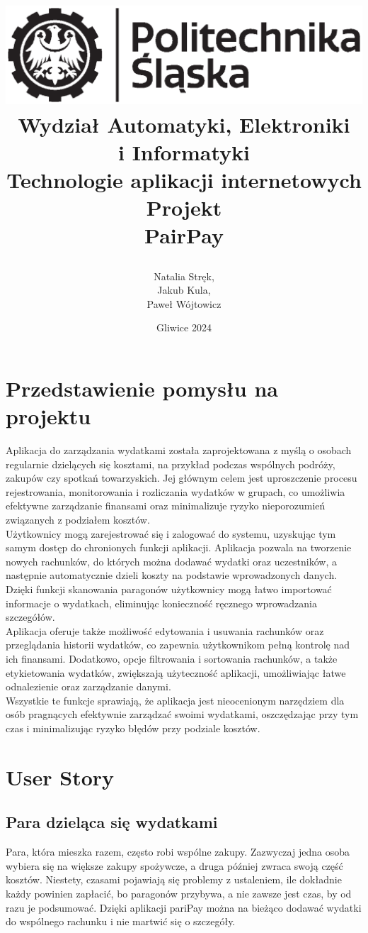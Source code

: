 \documentclass[12pt,titlepage]{article}
\title{
\includegraphics[scale=0.75]{img/politechnika_sl_logo_bw_poziom_pl.eps}\\
\textbf{Wydział Automatyki, Elektroniki\\
i Informatyki}\\
\vspace*{1cm}
Technologie aplikacji internetowych \\ Projekt \\ PairPay

\vspace*{5cm}
}
\author{
Natalia Stręk,\\
Jakub Kula,\\
Paweł Wójtowicz
}
\date{Gliwice 2024}
\begin{document}
\maketitle
\newpage
\section{Przedstawienie pomysłu na projektu}

Aplikacja do zarządzania wydatkami została zaprojektowana z myślą o osobach regularnie dzielących się kosztami, na przykład podczas wspólnych podróży, zakupów czy spotkań towarzyskich. Jej głównym celem jest uproszczenie procesu rejestrowania, monitorowania i rozliczania wydatków w grupach, co umożliwia efektywne zarządzanie finansami oraz minimalizuje ryzyko nieporozumień związanych z podziałem kosztów.\\

Użytkownicy mogą zarejestrować się i zalogować do systemu, uzyskując tym samym dostęp do chronionych funkcji aplikacji. Aplikacja pozwala na tworzenie nowych rachunków, do których można dodawać wydatki oraz uczestników, a następnie automatycznie dzieli koszty na podstawie wprowadzonych danych. Dzięki funkcji skanowania paragonów użytkownicy mogą łatwo importować informacje o wydatkach, eliminując konieczność ręcznego wprowadzania szczegółów.\\

Aplikacja oferuje także możliwość edytowania i usuwania rachunków oraz przeglądania historii wydatków, co zapewnia użytkownikom pełną kontrolę nad ich finansami. Dodatkowo, opcje filtrowania i sortowania rachunków, a także etykietowania wydatków, zwiększają użyteczność aplikacji, umożliwiając łatwe odnalezienie oraz zarządzanie danymi.\\

Wszystkie te funkcje sprawiają, że aplikacja jest nieocenionym narzędziem dla osób pragnących efektywnie zarządzać swoimi wydatkami, oszczędzając przy tym czas i minimalizując ryzyko błędów przy podziale kosztów.

\section{User Story}
\subsection{Para dzieląca się wydatkami}
Para, która mieszka razem, często robi wspólne zakupy. Zazwyczaj jedna osoba wybiera się na większe zakupy spożywcze, a druga później zwraca swoją część kosztów. Niestety, czasami pojawiają się problemy z ustaleniem, ile dokładnie każdy powinien zapłacić, bo paragonów przybywa, a nie zawsze jest czas, by od razu je podsumować. Dzięki aplikacji pariPay można na bieżąco dodawać wydatki do wspólnego rachunku i nie martwić się o szczegóły. 
\end{document}
